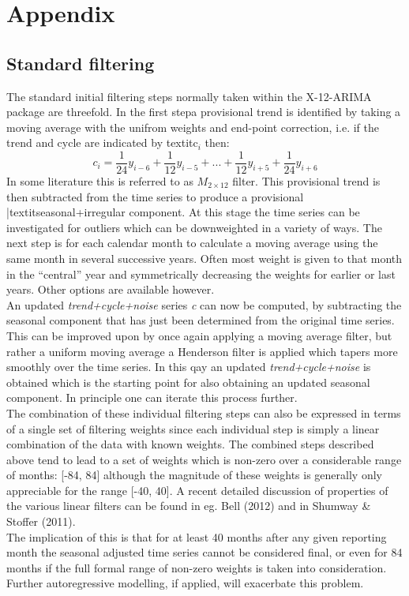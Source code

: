 \documentclass{article}
\begin{document}
\section*{Appendix}
\bigskip
\subsection*{Standard filtering}
The standard initial filtering steps normally taken within the X-12-ARIMA package are threefold. In the first stepa provisional trend is identified by taking a moving average with the unifrom weights and end-point correction, i.e. if the trend and cycle are indicated by textit{c$_i$} then:
\begin{equation*}
c_i=\frac{1}{24}y_{i-6}+\frac{1}{12}y_{i-5}+...+\frac{1}{12}y_{i+5}+\frac{1}{24}y_{i+6}
\end{equation*}
In some literature this is referred to as $M_{2\times12}$ filter. This provisional trend is then subtracted from the time series to produce a provisional |textit{seasonal+irregular} component. At this stage the time series can be investigated for outliers which can be downweighted in a variety of ways. The next step is for each calendar month to calculate a moving average using the same month in several successive years. Often most weight is given to that month in the ``central'' year and symmetrically decreasing the weights for earlier or last years. Other options are available however.\\An updated \textit{trend+cycle+noise} series \textit{c} can now be computed, by subtracting the seasonal component that has just been determined from the original time series. This can be improved upon by once again applying a moving average filter, but rather a uniform moving average a Henderson filter is applied which tapers more smoothly over the time series. In this qay an updated \textit{trend+cycle+noise} is obtained which is the starting point for also obtaining an updated seasonal component. In principle one can iterate this process further.\\The combination of these individual filtering steps can also be expressed in terms of a single set of filtering weights since each individual step is simply a linear combination of the data with known weights. The combined steps described above tend to lead to a set of weights which is non-zero over a considerable range of months: [-84, 84]
 although the magnitude of these weights is generally only appreciable for the range [-40, 40]. A recent detailed discussion of properties of the various linear filters can be found in eg. Bell (2012) and in Shumway \& Stoffer (2011).\\The implication of this is that for at least 40 months after any given reporting month the seasonal adjusted time series cannot be considered final, or even for 84 months if the full formal range of non-zero weights is taken into consideration. Further autoregressive modelling, if applied, will exacerbate this problem.
\end{document}
